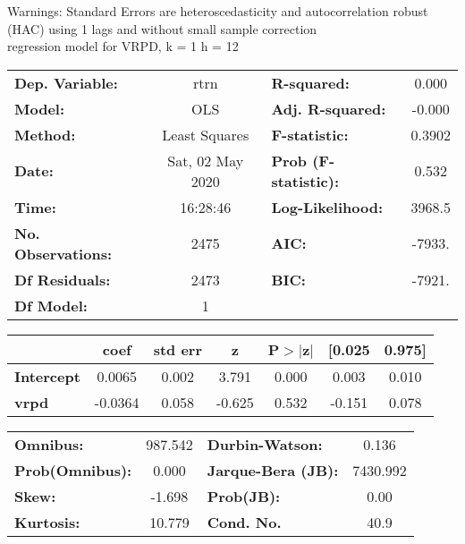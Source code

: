 Warnings: \newline
 [1] Standard Errors are heteroscedasticity and autocorrelation robust (HAC) using 1 lags and without small sample correction\\ 

regression model for VRPD, k = 1 h = 12\begin{center}
\begin{tabular}{lclc}
\toprule
\textbf{Dep. Variable:}    &       rtrn       & \textbf{  R-squared:         } &     0.000   \\
\textbf{Model:}            &       OLS        & \textbf{  Adj. R-squared:    } &    -0.000   \\
\textbf{Method:}           &  Least Squares   & \textbf{  F-statistic:       } &    0.3902   \\
\textbf{Date:}             & Sat, 02 May 2020 & \textbf{  Prob (F-statistic):} &    0.532    \\
\textbf{Time:}             &     16:28:46     & \textbf{  Log-Likelihood:    } &    3968.5   \\
\textbf{No. Observations:} &        2475      & \textbf{  AIC:               } &    -7933.   \\
\textbf{Df Residuals:}     &        2473      & \textbf{  BIC:               } &    -7921.   \\
\textbf{Df Model:}         &           1      & \textbf{                     } &             \\
\bottomrule
\end{tabular}
\begin{tabular}{lcccccc}
                   & \textbf{coef} & \textbf{std err} & \textbf{z} & \textbf{P$> |$z$|$} & \textbf{[0.025} & \textbf{0.975]}  \\
\midrule
\textbf{Intercept} &       0.0065  &        0.002     &     3.791  &         0.000        &        0.003    &        0.010     \\
\textbf{vrpd}      &      -0.0364  &        0.058     &    -0.625  &         0.532        &       -0.151    &        0.078     \\
\bottomrule
\end{tabular}
\begin{tabular}{lclc}
\textbf{Omnibus:}       & 987.542 & \textbf{  Durbin-Watson:     } &    0.136  \\
\textbf{Prob(Omnibus):} &   0.000 & \textbf{  Jarque-Bera (JB):  } & 7430.992  \\
\textbf{Skew:}          &  -1.698 & \textbf{  Prob(JB):          } &     0.00  \\
\textbf{Kurtosis:}      &  10.779 & \textbf{  Cond. No.          } &     40.9  \\
\bottomrule
\end{tabular}
\end{center}

